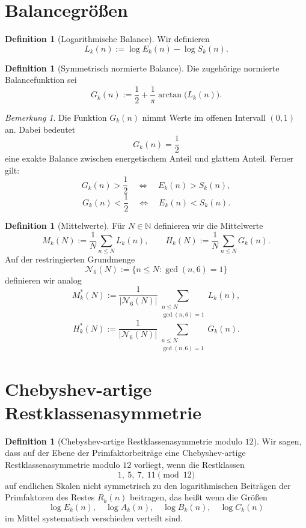 \documentclass[11pt,a4paper]{article}
\theoremstyle{definition}
\newtheorem{definition}[satz]{Definition}
\theoremstyle{remark}
\newtheorem{bemerkung}[satz]{Bemerkung}
\begin{document}
	\section{Balancegrößen}
	
	\begin{definition}[Logarithmische Balance]
		Wir definieren
		\[
		L_k(n):=\log E_k(n)-\log S_k(n).
		\]
	\end{definition}
	
	\begin{definition}[Symmetrisch normierte Balance]
		Die zugehörige normierte Balancefunktion sei
		\[
		G_k(n):=\frac12+\frac1\pi\arctan\!\bigl(L_k(n)\bigr).
		\]
	\end{definition}
	
	\begin{bemerkung}
		Die Funktion \(G_k(n)\) nimmt Werte im offenen Intervall \((0,1)\) an.
		Dabei bedeutet
		\[
		G_k(n)=\frac12
		\]
		eine exakte Balance zwischen energetischem Anteil und glattem Anteil. Ferner gilt:
		\[
		G_k(n)>\frac12
		\quad\Longleftrightarrow\quad
		E_k(n)>S_k(n),
		\]
		\[
		G_k(n)<\frac12
		\quad\Longleftrightarrow\quad
		E_k(n)<S_k(n).
		\]
	\end{bemerkung}
	
	\begin{definition}[Mittelwerte]
		Für \(N\in\mathbb{N}\) definieren wir die Mittelwerte
		\[
		M_k(N):=\frac{1}{N}\sum_{n\le N}L_k(n),
		\qquad
		H_k(N):=\frac{1}{N}\sum_{n\le N}G_k(n).
		\]
		Auf der restringierten Grundmenge
		\[
		\mathcal N_6(N):=\{n\le N:\gcd(n,6)=1\}
		\]
		definieren wir analog
		\[
		M_k^\ast(N):=
		\frac{1}{|\mathcal N_6(N)|}
		\sum_{\substack{n\le N\\ \gcd(n,6)=1}}L_k(n),
		\]
		\[
		H_k^\ast(N):=
		\frac{1}{|\mathcal N_6(N)|}
		\sum_{\substack{n\le N\\ \gcd(n,6)=1}}G_k(n).
		\]
	\end{definition}
	
	\section{Chebyshev-artige Restklassenasymmetrie}
	
	\begin{definition}[Chebyshev-artige Restklassenasymmetrie modulo \(12\)]
		Wir sagen, dass auf der Ebene der Primfaktorbeiträge eine Chebyshev-artige
		Restklassenasymmetrie modulo \(12\) vorliegt, wenn die Restklassen
		\[
		1,\ 5,\ 7,\ 11 \pmod{12}
		\]
		auf endlichen Skalen nicht symmetrisch zu den logarithmischen Beiträgen der Primfaktoren des
		Restes \(R_k(n)\) beitragen, das heißt wenn die Größen
		\[
		\log E_k(n),\quad \log A_k(n),\quad \log B_k(n),\quad \log C_k(n)
		\]
		im Mittel systematisch verschieden verteilt sind.
	\end{definition}
	
\end{document}
